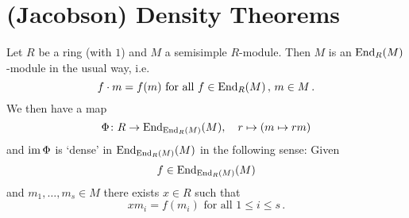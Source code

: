 \section{(Jacobson) Density Theorems}


\begin{thrm}
  Let $R$ be a ring (with $1$) and $M$ a semisimple $R$-module.
  Then $M$ is an $\operatorname{End}_R(M)$-module in the usual way, i.e.\
  \[
      f \cdot m
    = f(m)
    \text{ for all }
    f \in \operatorname{End}_R(M)\,,\,
    m \in M \,.
  \]
  We then have a map
  \[
            \Phi
    \colon  R
    \to     \operatorname{End}_{\operatorname{End}_R(M)}(M),
    \quad   r
    \mapsto (m \mapsto rm)
  \]
  and $\operatorname{im} \Phi$ is `dense' in $\operatorname{End}_{\operatorname{End}_R(M)}(M)$ in the following sense:
  Given
  \[
    f \in \operatorname{End}_{\operatorname{End}_R(M)}(M)
  \]
  and $m_1, \dotsc, m_s \in M$ there exists $x \in R$ such that
  \[
      x m_i
    = f(m_i)
    \text{ for all }
    1 \leq i \leq s \,.
  \]
\end{thrm}
